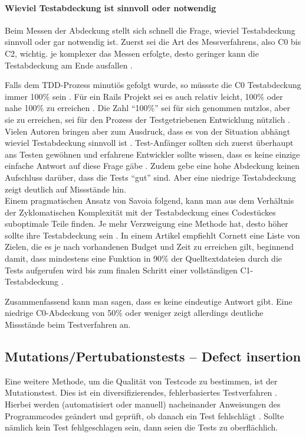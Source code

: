  \paragraph{Wieviel Testabdeckung ist sinnvoll oder notwendig}

 Beim Messen der Abdeckung stellt sich schnell die Frage, wieviel Testabdeckung sinnvoll oder gar notwendig ist. Zuerst sei die Art des Messverfahrens, also C0 bis C2, wichtig. je komplexer das Messen erfolgte, desto geringer kann die Testabdeckung am Ende ausfallen \citep{catherine_powell_abakas_2008}.

 Falls dem TDD-Prozess minutiös gefolgt wurde, so müssste die C0 Testabdeckung immer 100\% sein \citep{beck_test_2002}. Für ein Rails Projekt sei es auch relativ leicht, 100\% oder nahe 100\% zu erreichen \citep{rappin_rails_2011}. Die Zahl "`100\%"' sei für sich genommen nutzlos, aber sie zu erreichen, sei für den Prozess der Testgetriebenen Entwicklung nützlich \citep[S. 270]{rappin_rails_2011}. Vielen Autoren bringen aber zum Ausdruck, dass es von der Situation abhängt wieviel Testabdeckung sinnvoll ist \citep{infoq_2007}. Test-Anfänger sollten sich zuerst überhaupt ans Testen gewöhnen und erfahrene Entwickler sollte wissen, dass es keine einzige einfache Antwort auf diese Frage gäbe \citep{infoq_2007}. Zudem gebe eine hohe Abdeckung keinen Aufschluss darüber, dass die Tests "`gut"' sind. Aber eine niedrige Testabdeckung zeigt deutlich auf Missstände hin.\\
 Einem pragmatischen Ansatz von Savoia folgend, kann man aus dem Verhältnis der Zyklomatischen Komplexität mit der Testabdeckung eines Codestückes suboptimale Teile finden. Je mehr Verzweigung eine Methode hat, desto höher sollte ihre Testabdeckung sein \citep{alberto_savoia_code_2007}. In einem Artikel empfiehlt Cornett eine Liste von Zielen, die es je nach vorhandenen Budget und Zeit zu erreichen gilt, beginnend damit, dass mindestens eine Funktion in 90\% der Quelltextdateien durch die Tests aufgerufen wird bis zum finalen Schritt einer vollständigen C1-Testabdeckung \citep{steve_cornett_code_1996}.

 Zusammenfassend kann man sagen, dass es keine eindeutige Antwort gibt. Eine niedrige C0-Abdeckung von 50\% oder weniger zeigt allerdings deutliche Missstände beim Testverfahren an.

 \subsection{Mutations/Pertubationstests -- Defect insertion}
 \label{sec:mutation}
 Eine weitere Methode, um die Qualität von Testcode zu bestimmen, ist der Mutationstest. Dies ist ein diversifizierendes, fehlerbasiertes Testverfahren \citep{liggesmeyer_modultest_1990}. Hierbei werden (automatisiert oder manuell) nacheinander Anweisungen des Programmcodes geändert und geprüft, ob danach ein Test fehlschlägt \citep{beck_test_2002}. Sollte nämlich kein Test fehlgeschlagen sein, dann seien die Tests zu oberflächlich.

